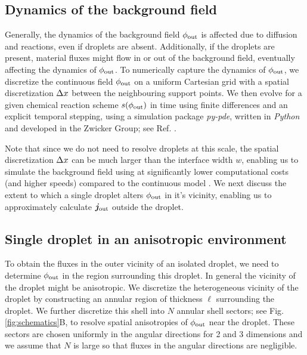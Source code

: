 \subsection{Dynamics of the background field}

Generally, the dynamics of the background field $\phi_\mathrm{out}$ is affected due to diffusion and reactions, even if droplets are absent.
Additionally, if the droplets are present, material fluxes might flow in or out of the background field, eventually affecting the dynamics of $\phi_\mathrm{out}$.
To numerically capture the dynamics of $\phi_\mathrm{out}$, we discretize the continuous field $\phi_\mathrm{out}$ on a uniform Cartesian grid with a spatial discretization $\Delta x$ between the neighbouring support points.
We then evolve  for a given chemical reaction scheme $s(\phi_\mathrm{out})$ in time using finite differences and an explicit temporal stepping, using a simulation package \textit{py-pde}, written in \textit{Python} and developed in the Zwicker Group; see Ref. \cite{Zwicker2020}.

Note that since we do not need to resolve droplets at this scale, the spatial discretization $\Delta x$ can be much larger than the interface width $w$, enabling us to simulate the background field using  at significantly lower computational costs (and higher speeds) compared to the continuous model .
We next discuss the extent to which a single droplet alters $\phi_\mathrm{out}$ in it's vicinity, enabling us to approximately calculate $\boldsymbol{j}_\mathrm{out}$ outside the droplet. 

\subsection{Single droplet in an anisotropic environment}

To obtain the fluxes in the outer vicinity of an isolated droplet, we need to determine $\phi_\mathrm{out}$ in the region surrounding this droplet.
In general the vicinity of the droplet might be anisotropic.
We discretize the heterogeneous vicinity of the droplet by constructing an annular region of thickness $\ell$ surrounding the droplet.
We further discretize this shell into $N$ annular shell sectors; see Fig. \ref{fig:schematics}B, to resolve spatial anisotropies of $\phi_\mathrm{out}$ near the droplet.
These sectors are chosen uniformly in the angular directions for 2 and 3 dimensions and we assume that $N$ is large so that fluxes in the angular directions are negligible.

